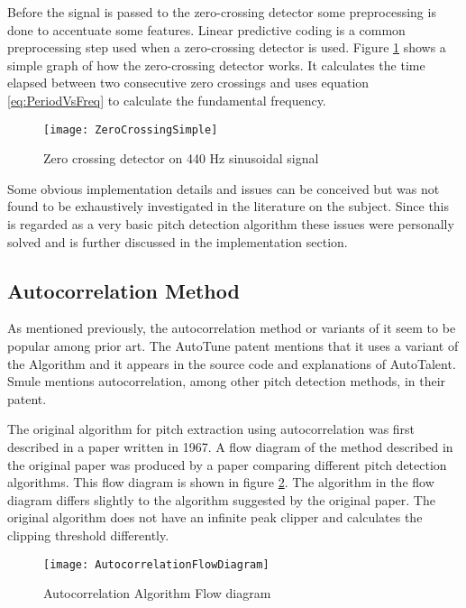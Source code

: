 Before the signal is passed to the zero-crossing detector some preprocessing is
done to accentuate some features. Linear predictive coding is a common
preprocessing step used when a zero-crossing detector is used\cite{PDABook}.
Figure \ref{fig:ZeroCrossing} shows a simple graph of how the zero-crossing
detector works. It calculates the time elapsed between two consecutive zero
crossings and uses equation \ref{eq:PeriodVsFreq} to calculate the fundamental frequency.

\begin{figure}[h]
	\texttt{[image: ZeroCrossingSimple]}
	\caption{Zero crossing detector on 440 Hz sinusoidal signal}
	\label{fig:ZeroCrossing}
\end{figure}

Some obvious implementation details and issues can be conceived but was not found
to be exhaustively investigated in the literature on the subject. Since this is
regarded as a very basic pitch detection algorithm these issues were personally
solved and is further discussed in the implementation section.

\subsection{Autocorrelation Method}

As mentioned previously, the autocorrelation method or variants of it seem to be
popular among prior art. The AutoTune patent\cite{AutoTunePatent} mentions that it
uses a variant of the Algorithm and it appears in the source code and explanations
of AutoTalent\cite{AutoTalent}. Smule mentions autocorrelation, among other pitch
detection methods, in their patent\cite{SmulePatent}.

The original algorithm for pitch extraction using autocorrelation was first
described in a paper written in 1967\cite{OriginalAutocorrelation}. A flow
diagram of the method described in the original paper was produced by a paper
comparing different pitch detection algorithms\cite{ComparitivePitch}. This flow
diagram is shown in figure \ref{fig:AutocorrelationFlowDiagram}. The algorithm in
the flow diagram differs slightly to the algorithm suggested by the original
paper. The original algorithm does not have an infinite peak clipper and
calculates the clipping threshold differently.

\begin{figure}[h]
	\texttt{[image: AutocorrelationFlowDiagram]}
	\caption{Autocorrelation Algorithm Flow diagram\cite{ComparitivePitch}}
	\label{fig:AutocorrelationFlowDiagram}
\end{figure}

